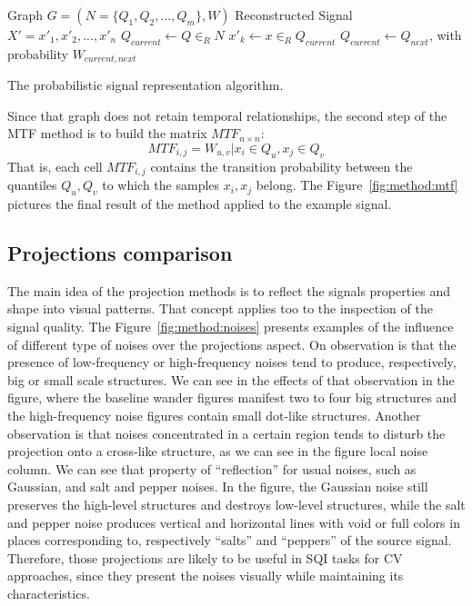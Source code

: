 \begin{algorithm}
    \begin{algorithmic}
        \Require Graph $G=(N=\{Q_1, Q_2, ..., Q_m\},W)$
        \Ensure Reconstructed Signal $X'=x'_1,x'_2,...,x'_n$
        \State $Q_{current} \gets Q \in_R N$ 
            \State $x'_k \gets x \in_R Q_{current}$
            \State $Q_{current} \gets Q_{next}$, with probability $W_{current,next}$
        \EndFor
    \end{algorithmic}
    \caption{The probabilistic signal representation algorithm. }
    \label{alg:mtf_reconstruction}
\end{algorithm}

Since that graph does not retain temporal relationships, the second step of the \gls{MTF} method is to build the matrix $MTF_{n \times n}$:
\begin{equation}
    MTF_{i,j} = W_{u,v} | x_i \in Q_u, x_j \in Q_v
\end{equation}
\noindent That is, each cell $MTF_{i,j}$ contains the transition probability between the quantiles $Q_u,Q_v$ to which the samples $x_i,x_j$ belong. The Figure~\ref{fig:method:mtf} pictures the final result of the method applied to the example signal. 



\subsection{Projections comparison}

The main idea of the projection methods is to reflect the signals properties and shape into visual patterns. That concept applies too to the inspection of the signal quality. The Figure~\ref{fig:method:noises} presents examples of the influence of different type of noises over the projections aspect. On observation is that the presence of low-frequency or high-frequency noises tend to produce, respectively, big or small scale structures. We can see in the effects of that observation in the figure, where the baseline wander figures manifest two to four big structures and the high-frequency noise figures contain small dot-like structures. Another observation is that noises concentrated in a certain region tends to disturb the projection onto a cross-like structure, as we can see in the figure local noise column. We can see that property of ``reflection'' for usual noises, such as Gaussian, and salt and pepper noises. In the figure, the Gaussian noise still preserves the high-level structures and destroys low-level structures, while the salt and pepper noise produces vertical and horizontal lines with void or full colors in places corresponding to, respectively ``salts'' and ``peppers'' of the source signal. Therefore, those projections are likely to be useful in \gls{SQI} tasks for \gls{CV} approaches, since they present the noises visually while maintaining its characteristics.  

